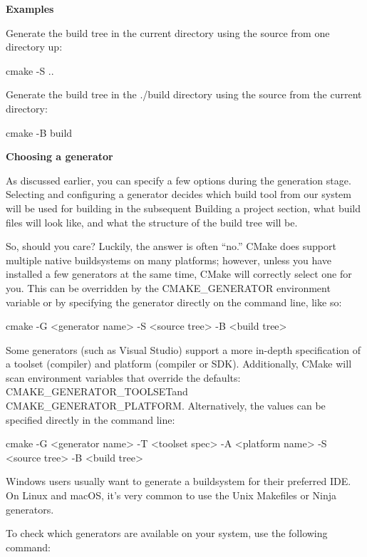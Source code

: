 \noindent
\textbf{Examples}

Generate the build tree in the current directory using the source from one directory up:

\begin{shell}
cmake -S ..
\end{shell}

Generate the build tree in the ./build directory using the source from the current directory:

\begin{shell}
cmake -B build
\end{shell}

\noindent
\textbf{Choosing a generator}

As discussed earlier, you can specify a few options during the generation stage. Selecting and configuring a generator decides which build tool from our system will be used for building in the subsequent Building a project section, what build files will look like, and what the structure of the build tree will be.

So, should you care? Luckily, the answer is often “no.” CMake does support multiple native buildsystems on many platforms; however, unless you have installed a few generators at the same time, CMake will correctly select one for you. This can be overridden by the CMAKE\_GENERATOR environment variable or by specifying the generator directly on the command line, like so:

\begin{shell}
cmake -G <generator name> -S <source tree> -B <build tree>
\end{shell}

Some generators (such as Visual Studio) support a more in-depth specification of a toolset (compiler) and platform (compiler or SDK). Additionally, CMake will scan environment variables that override the defaults: CMAKE\_GENERATOR\_TOOLSETand CMAKE\_GENERATOR\_PLATFORM. Alternatively, the values can be specified directly in the command line:

\begin{shell}
cmake -G <generator name>
      -T <toolset spec>
      -A <platform name>
      -S <source tree> -B <build tree>
\end{shell}

Windows users usually want to generate a buildsystem for their preferred IDE. On Linux and macOS, it’s very common to use the Unix Makefiles or Ninja generators.

To check which generators are available on your system, use the following command:

